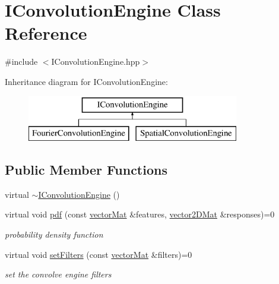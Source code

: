 \hypertarget{class_i_convolution_engine}{\section{I\-Convolution\-Engine Class Reference}
\label{class_i_convolution_engine}
}


{\ttfamily \#include $<$I\-Convolution\-Engine.\-hpp$>$}

Inheritance diagram for I\-Convolution\-Engine\-:\begin{figure}[H]
\begin{center}
\leavevmode
\includegraphics[height=2.000000cm]{class_i_convolution_engine}
\end{center}
\end{figure}
\subsection*{Public Member Functions}
\begin{DoxyCompactItemize}
\item 
virtual \hyperlink{class_i_convolution_engine_a554cb87e8dbd32552defd43549b9c1b3}{$\sim$\-I\-Convolution\-Engine} ()
\item 
virtual void \hyperlink{class_i_convolution_engine_ab5aaabb634629a714d397a6c1a9c9400}{pdf} (const \hyperlink{types_8hpp_a3207a7addcfa415d1c83622febcb1e9b}{vector\-Mat} \&features, \hyperlink{types_8hpp_a33cacb85be7b8df3dc0b67d5d849f4cc}{vector2\-D\-Mat} \&responses)=0
\begin{DoxyCompactList}\small\item\em probability density function \end{DoxyCompactList}\item 
virtual void \hyperlink{class_i_convolution_engine_a3570aae351b5fcb93bcd87a06c65ea0a}{set\-Filters} (const \hyperlink{types_8hpp_a3207a7addcfa415d1c83622febcb1e9b}{vector\-Mat} \&filters)=0
\begin{DoxyCompactList}\small\item\em set the convolve engine filters \end{DoxyCompactList}\end{DoxyCompactItemize}


